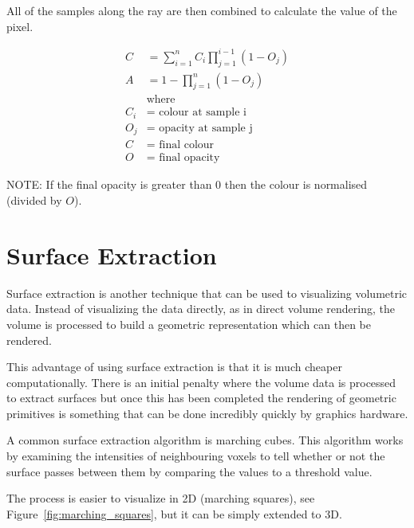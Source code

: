 All of the samples along the ray are then combined to calculate the value of the pixel.

\begin{align*}
	C &= \sum\limits_{i=1}^n C_{i}\prod\limits_{j=1}^{i-1}(1 - O_j) \\
	A &= 1 - \prod\limits_{j=1}^n(1 - O_j) \\
	& \text{where} \\
	C_i &= \text{ colour at sample i} \\
	O_j &= \text{ opacity at sample j} \\
	C &= \text{ final colour} \\
	O &= \text{ final opacity}
\end{align*}

NOTE: If the final opacity is greater than 0 then the colour is normalised (divided by $O$).

\newpage
\section{Surface Extraction}\label{background:surfaceextraction}
Surface extraction is another technique that can be used to visualizing volumetric data. Instead of visualizing the data directly, as in direct volume rendering, the volume is processed to build a geometric representation which can then be rendered.

This advantage of using surface extraction is that it is much cheaper computationally\cite{surfacevsvolumerendering}. There is an initial penalty where the volume data is processed to extract surfaces but once this has been completed the rendering of geometric primitives is something that can be done incredibly quickly by graphics hardware.

A common surface extraction algorithm is marching cubes. This algorithm works by examining the intensities of neighbouring voxels to tell whether or not the surface passes between them by comparing the values to a threshold value. 

The process is easier to visualize in 2D (marching squares), see Figure~\ref{fig:marching_squares}, but it can be simply extended to 3D.

